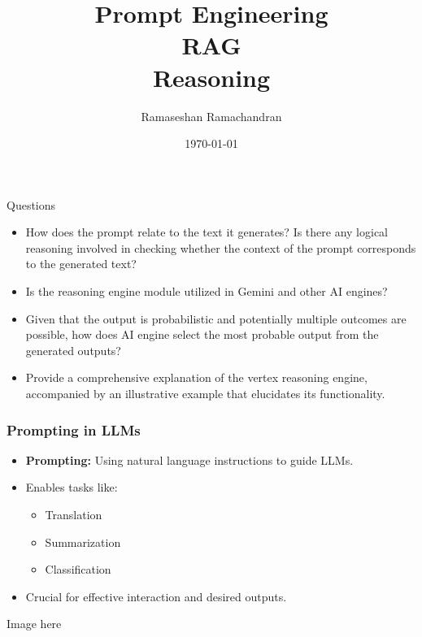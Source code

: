 
\usepackage{titlesec}

\title{Prompt Engineering\\RAG\\Reasoning}
\author{Ramaseshan Ramachandran}
\date{\today}



\maketitle

\begin{frame}[fragile]
\begin{block}{Questions}
\begin{itemize}
\item How does the prompt relate to the text it generates? Is there any logical reasoning involved in checking whether the context of the prompt corresponds to the generated text?
\item Is the reasoning engine module utilized in Gemini and other AI engines?
\item Given that the output is probabilistic and potentially multiple outcomes are possible, how does AI engine select the most probable output from the generated outputs?
\item Provide a comprehensive explanation of the vertex reasoning engine, accompanied by an illustrative example that elucidates its functionality.
\end{itemize}
\end{block}
\end{frame}
\begin{frame}
    \frametitle{Prompting in LLMs}
    \begin{itemize}
        \item \textbf{Prompting:} Using natural language instructions to guide LLMs.
        \item Enables tasks like:
            \begin{itemize}
                \item Translation
                \item Summarization
                \item Classification
            \end{itemize}
        \item  Crucial for effective interaction and desired outputs.
    \end{itemize}
    Image here
\end{frame}


